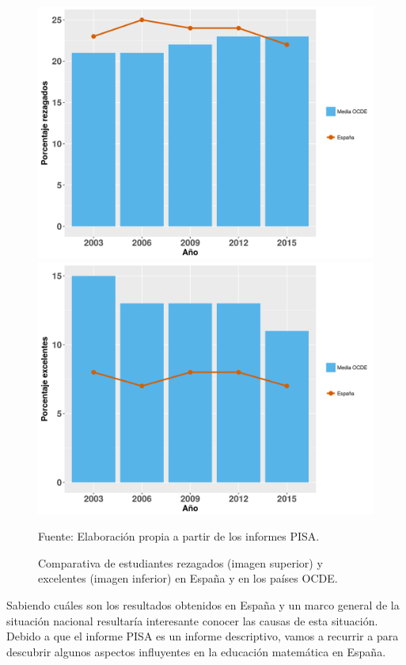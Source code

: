 \begin{figure}[hbt]
\begin{center}
\includegraphics[scale=0.45]{img/PisaRezagados.png}
\includegraphics[scale=0.45]{img/PisaExcelentes.png}
\caption{Comparativa de estudiantes rezagados (imagen superior) y excelentes (imagen inferior) en España y en los países OCDE. }
\label{fig::PisaRezEx}
\end{center}
\vspace{-0.5cm}
\small{Fuente: Elaboración propia a partir de los informes PISA.}
\end{figure}
\FloatBarrier

Sabiendo cuáles son los resultados obtenidos en España y un marco general de la situación nacional resultaría interesante conocer las causas de esta situación.
%
Debido a que el informe PISA es un informe descriptivo, vamos a recurrir a \cite{ActitudesHaciaMates} para descubrir algunos aspectos influyentes en la educación matemática en España.



